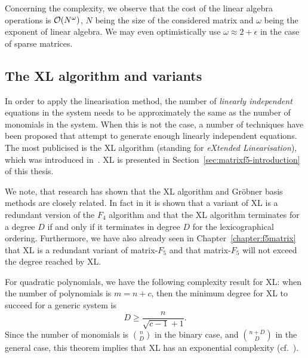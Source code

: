 Concerning the complexity, we observe that the cost of the linear algebra operations is $\mathcal{O}\!\left(N^\omega\right)$, $N$ being the size of the considered matrix and $\omega$ being the exponent of linear algebra. We may even optimistically use $\omega\approx 2+\epsilon$ in the case of sparse matrices.

\subsection{The XL algorithm and variants}

In order to apply the linearisation method, the number of \emph{linearly independent} equations in the system needs to be approximately the same as the number of monomials in the system. When this is not the case, a number of techniques have been proposed that attempt to generate enough linearly independent equations. The most publicised is the XL algorithm (standing for \emph{eXtended Linearisation}), which was introduced in~\cite{courtois-klimov-patarin-shamir:eurocrypt2000}. XL is presented in Section~\ref{sec:matrixf5-introduction} of this thesis. 

We note, that research has shown that the XL algorithm and Gröbner basis methods are closely related. In fact in \cite{ars-faugere:asiacrypt04} it is shown that a variant of XL is a redundant version of the $F_4$ algorithm and that the XL algorithm terminates for a degree $D$ if and only if it terminates in degree $D$ for the lexicographical ordering.  Furthermore, we have also already seen in Chapter~\ref{chapter:f5matrix} that XL is a redundant variant of matrix-$F_5$ and that matrix-$F_5$ will not exceed the degree reached by XL.

For quadratic polynomials, we have the following complexity result for XL: when the number of polynomials is $m=n+c$, then the minimum degree for XL to succeed for a generic system is
  \[
  D\geq \frac{n}{\sqrt{c-1}+1}.
  \]
Since the number of monomials is $\binom{n}{D}$ in the binary case, and $\binom{n+D}{D}$ in the general case, this theorem implies that XL has an exponential complexity (cf.\ \cite{diem:asiacrypt04,yang-cheng:acisp04}).

